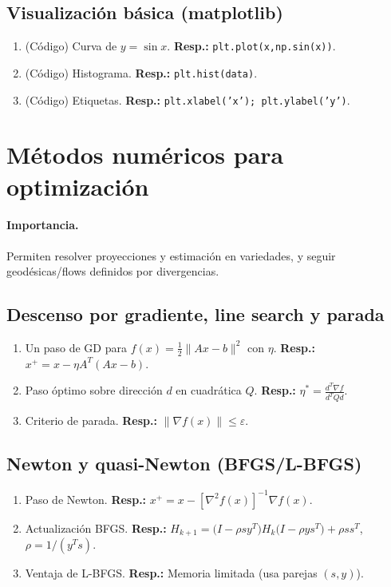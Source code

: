 	\subsection*{Visualización básica (matplotlib)}
	\begin{enumerate}
		\item (Código) Curva de $y=\sin x$. \textbf{Resp.:} \texttt{plt.plot(x,np.sin(x))}.
		\item (Código) Histograma. \textbf{Resp.:} \texttt{plt.hist(data)}.
		\item (Código) Etiquetas. \textbf{Resp.:} \texttt{plt.xlabel('x'); plt.ylabel('y')}.
	\end{enumerate}
	
	\section{Métodos numéricos para optimización}
	\paragraph{Importancia.} Permiten resolver proyecciones y estimación en variedades, y seguir geodésicas/flows definidos por divergencias.
	
	\subsection*{Descenso por gradiente, line search y parada}
	\begin{enumerate}
		\item Un paso de GD para $f(x)=\tfrac12\|Ax-b\|^2$ con $\eta$. \textbf{Resp.:} $x^{+}=x-\eta A^T(Ax-b)$.
		\item Paso óptimo sobre dirección $d$ en cuadrática $Q$. \textbf{Resp.:} $\eta^*=\frac{d^T\nabla f}{d^TQd}$.
		\item Criterio de parada. \textbf{Resp.:} $\|\nabla f(x)\|\le \varepsilon$.
	\end{enumerate}
	
	\subsection*{Newton y quasi-Newton (BFGS/L-BFGS)}
	\begin{enumerate}
		\item Paso de Newton. \textbf{Resp.:} $x^{+}=x-[\nabla^2 f(x)]^{-1}\nabla f(x)$.
		\item Actualización BFGS. \textbf{Resp.:} $H_{k+1}=\big(I-\rho s y^T\big)H_k\big(I-\rho y s^T\big)+\rho s s^T$, $\rho=1/(y^Ts)$.
		\item Ventaja de L-BFGS. \textbf{Resp.:} Memoria limitada (usa parejas $(s,y)$).
	\end{enumerate}
	
